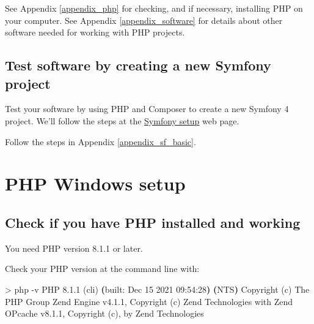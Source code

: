 \documentclass[a4paperpaper,openright]{book}
\newenvironment{Shaded}{}{}
\newcommand{\ExtensionTok}[1]{#1}
\newcommand{\KeywordTok}[1]{\textcolor[rgb]{0.00,0.44,0.13}{\textbf{#1}}}
\newcommand{\NormalTok}[1]{#1}
\newcommand{\OperatorTok}[1]{\textcolor[rgb]{0.40,0.40,0.40}{#1}}
\begin{document}
See Appendix \ref{appendix_php} for checking, and if necessary,
installing PHP on your computer. See Appendix \ref{appendix_software}
for details about other software needed for working with PHP projects.

\hypertarget{test-software-by-creating-a-new-symfony-project}{%
\section{Test software by creating a new Symfony
project}\label{test-software-by-creating-a-new-symfony-project}}

Test your software by using PHP and Composer to create a new Symfony 4
project. We'll follow the steps at the
\href{https://symfony.com/doc/current/setup.html}{Symfony setup} web
page.

Follow the steps in Appendix \ref{appendix_sf_basic}.

\hypertarget{php-windows-setup}{%
\chapter{\texorpdfstring{PHP Windows
setup\label{appendix_php}}{PHP Windows setup}}\label{php-windows-setup}}

\hypertarget{check-if-you-have-php-installed-and-working}{%
\section{Check if you have PHP installed and
working}\label{check-if-you-have-php-installed-and-working}}

You need PHP version 8.1.1 or later.

Check your PHP version at the command line with:

\begin{Shaded}
\begin{Highlighting}[]
   \OperatorTok{>} \ExtensionTok{php}\NormalTok{ -v}
   \ExtensionTok{PHP}\NormalTok{ 8.1.1 (cli) }\KeywordTok{(}\ExtensionTok{built}\NormalTok{: Dec 15 2021 09:54:28}\KeywordTok{)} \KeywordTok{(}\ExtensionTok{NTS}\KeywordTok{)}
   \ExtensionTok{Copyright}\NormalTok{ (c) }\ExtensionTok{The}\NormalTok{ PHP Group}
   \ExtensionTok{Zend}\NormalTok{ Engine v4.1.1, Copyright (c) }\ExtensionTok{Zend}\NormalTok{ Technologies}
       \ExtensionTok{with}\NormalTok{ Zend OPcache v8.1.1, Copyright (c), }\ExtensionTok{by}\NormalTok{ Zend Technologies}
\end{Highlighting}
\end{Shaded}
\end{document}
